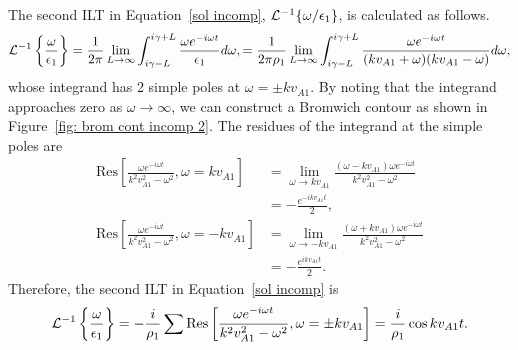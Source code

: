 \documentclass{aastex61}
\begin{document}
The second ILT in Equation~\eqref{sol incomp}, $\mathcal{L}^{-1}\{ \omega / \epsilon_1 \}$, is calculated as follows.
\begin{equation}
\mathcal{L}^{-1}\left\{ \frac{\omega}{\e_1} \right\} = \frac{1}{2\pi}\lim_{L \to \infty} \int_{i\gamma - L}^{i\gamma + L} \frac{\omega e^{-i\omega t}}{\e_1} d\omega,
= \frac{1}{2\pi\rho_1}\lim_{L \to \infty} \int_{i\gamma - L}^{i\gamma + L} \frac{\omega e^{-i\omega t}}{(kv_{A1} + \omega)(kv_{A1} - \omega)} d\omega,
\end{equation}
whose integrand has 2 simple poles at $\omega = \pm k v_{A1}$. By noting that the integrand approaches zero as $\omega \to \infty$, we can construct a Bromwich contour as shown in Figure~\ref{fig: brom cont incomp 2}. The residues of the integrand at the simple poles are
\begin{align}
\mathrm{Res}\left[\frac{\omega e^{-i\omega t}}{k^2v_{A1}^2 - \omega^2}, \omega = kv_{A1} \right] &= 
\lim_{\omega \to kv_{A1}} \frac{(\omega - kv_{A1}) \omega e^{-i\omega t}}{k^2v_{A1}^2 - \omega^2} \\ 
&= -\frac{e^{-ikv_{A1} t}}{2}, \\
\mathrm{Res}\left[\frac{\omega e^{-i\omega t}}{k^2v_{A1}^2 - \omega^2}, \omega = -kv_{A1} \right] &= 
\lim_{\omega \to -kv_{A1}} \frac{(\omega + kv_{A1}) \omega e^{-i\omega t}}{k^2v_{A1}^2 - \omega^2} \\ 
&= -\frac{e^{ikv_{A1} t}}{2}.
\end{align}
Therefore, the second ILT in Equation~\eqref{sol incomp} is
\begin{equation}
\mathcal{L}^{-1}\left\{ \frac{\omega}{\e_1} \right\} = -\frac{i}{\rho_1} \sum \mathrm{Res} \left[ \frac{\omega e^{-i\omega t}}{k^2v_{A1}^2 - \omega^2}, \omega = \pm kv_{A1} \right] = \frac{i}{\rho_1}\cos{kv_{A1}t}.
\end{equation}
\end{document}
